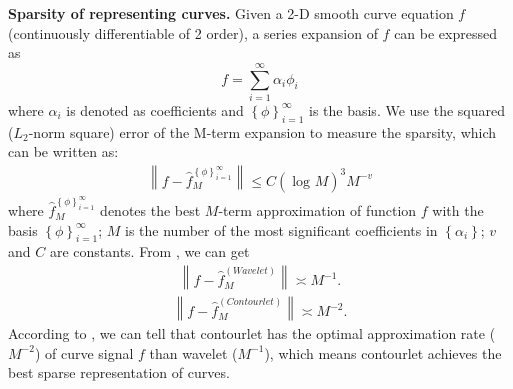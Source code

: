 \documentclass[10pt,times,mathptm,psfig,twocolumn,journals]{IEEEtran}
\begin{document}
\textbf{Sparsity of representing curves.} Given a 2-D smooth curve equation $f$ (continuously differentiable of 2 order), a series expansion of $f$ can be expressed as
\begin{equation}
f = \sum_{i = 1}^{\infty}\alpha_{i}\phi_{i}   
\end{equation}
where $\alpha_{i}$ is denoted as coefficients and $\left \{ \phi  \right \} _{i=1}^{\infty }$ is the basis. We use the squared ($L_{2}$-norm square) error of the M-term expansion to measure the sparsity, which can be written as:
\begin{eqnarray}
\left \| f-\hat{f}_{M}^{\left \{ \phi  \right \} _{i=1}^{\infty }} \right \|\le  C(\log_{}{M} )^{3}M^{-v}
\end{eqnarray}
where $\hat{f}_{M}^{\left \{ \phi  \right \} _{i=1}^{\infty }}$ denotes the best $M$-term approximation of function $f$ with the basis $\left \{ \phi  \right \} _{i=1}^{\infty }$; $M$ is the number of the most significant coefficients in $\left \{\alpha_{i}\right \}$; $v$ and $C$ are constants. From \cite{MengkunLiu2021CCNNCC}, we can get
\begin{eqnarray}
\left \| f-\hat{f}_{M}^{(Wavelet)} \right \|\asymp M^{-1}.
\end{eqnarray}
\begin{eqnarray}
\left \| f-\hat{f}_{M}^{(Contourlet)} \right \|\asymp M^{-2}.
\end{eqnarray}
According to \cite{DavidLDonoho1998DataCA}, we can tell that contourlet has the optimal approximation rate ($M^{-2}$) of curve signal $f$ than wavelet ($M^{-1}$), which means contourlet achieves the best sparse representation of curves.
\end{document}
